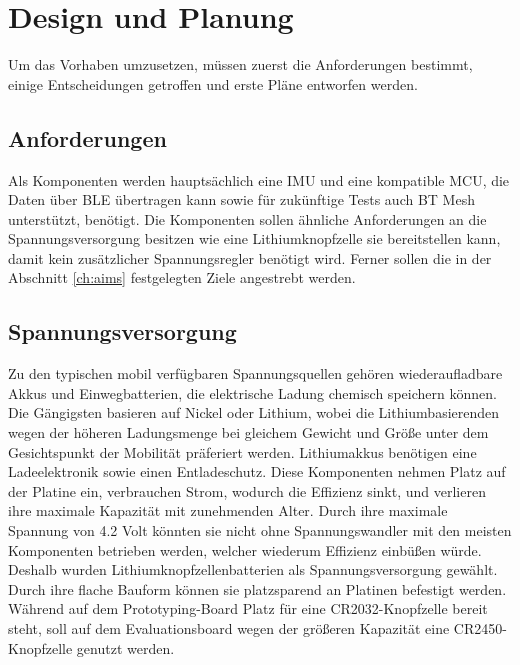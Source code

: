 \chapter{Design und Planung}
\label{ch:design}
Um das Vorhaben umzusetzen, müssen zuerst die Anforderungen bestimmt, einige Entscheidungen getroffen und erste Pläne entworfen werden.

\section{Anforderungen}
Als Komponenten werden hauptsächlich eine IMU und eine kompatible MCU, die Daten über BLE übertragen kann sowie für zukünftige Tests auch BT Mesh unterstützt, benötigt.
Die Komponenten sollen ähnliche Anforderungen an die Spannungsversorgung besitzen wie eine Lithiumknopfzelle sie bereitstellen kann, damit kein zusätzlicher Spannungsregler benötigt wird.
Ferner sollen die in der Abschnitt \ref{ch:aims} festgelegten Ziele angestrebt werden.

\section{Spannungsversorgung}
Zu den typischen mobil verfügbaren Spannungsquellen gehören wiederaufladbare Akkus und Einwegbatterien, die elektrische Ladung chemisch speichern können.
Die Gängigsten basieren auf Nickel oder Lithium, wobei die Lithiumbasierenden wegen der höheren Ladungsmenge bei gleichem Gewicht und Größe unter dem Gesichtspunkt der Mobilität präferiert werden.
Lithiumakkus benötigen eine Ladeelektronik sowie einen Entladeschutz.
Diese Komponenten nehmen Platz auf der Platine ein, verbrauchen Strom, wodurch die Effizienz sinkt, und verlieren ihre maximale Kapazität mit zunehmenden Alter.
Durch ihre maximale Spannung von 4.2 Volt könnten sie nicht ohne Spannungswandler mit den meisten Komponenten betrieben werden, welcher wiederum Effizienz einbüßen würde. \cite{site_liion}\\
Deshalb wurden Lithiumknopfzellenbatterien als Spannungsversorgung gewählt.
Durch ihre flache Bauform können sie platzsparend an Platinen befestigt werden.
Während auf dem Prototyping-Board Platz für eine CR2032-Knopfzelle bereit steht, soll auf dem Evaluationsboard wegen der größeren Kapazität eine CR2450-Knopfzelle genutzt werden.


